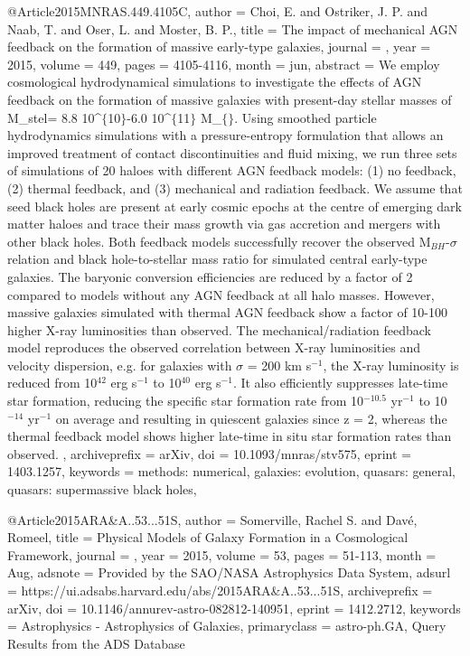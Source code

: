 \documentclass[longauth]{aa}
\begin{document}
{{{{@Article{2015MNRAS.449.4105C,
  author        = {Choi, E. and Ostriker, J. P. and Naab, T. and Oser, L. and Moster, B. P.},
  title         = {The impact of mechanical AGN feedback on the formation of massive early-type galaxies},
  journal       = {\mnras},
  year          = {2015},
  volume        = {449},
  pages         = {4105-4116},
  month         = jun,
  abstract      = {We employ cosmological hydrodynamical simulations to investigate the
effects of AGN feedback on the formation of massive galaxies with
present-day stellar masses of M\_stel= 8.8 {\times} 10\^{}$\{$10$\}$-6.0 {\times}
10\^{}$\{$11$\}$ M\_$\{${\sun}$\}$. Using smoothed particle hydrodynamics simulations
with a pressure-entropy formulation that allows an improved treatment of
contact discontinuities and fluid mixing, we run three sets of
simulations of 20 haloes with different AGN feedback models: (1) no
feedback, (2) thermal feedback, and (3) mechanical and radiation
feedback. We assume that seed black holes are present at early cosmic
epochs at the centre of emerging dark matter haloes and trace their mass
growth via gas accretion and mergers with other black holes. Both
feedback models successfully recover the observed M$_{BH}$-{$\sigma$}
relation and black hole-to-stellar mass ratio for simulated central
early-type galaxies. The baryonic conversion efficiencies are reduced by
a factor of 2 compared to models without any AGN feedback at all halo
masses. However, massive galaxies simulated with thermal AGN feedback
show a factor of {\tilde}10-100 higher X-ray luminosities than observed.
The mechanical/radiation feedback model reproduces the observed
correlation between X-ray luminosities and velocity dispersion, e.g. for
galaxies with {$\sigma$} = 200 km s$^{- 1}$, the X-ray luminosity is
reduced from 10$^{42}$ erg s$^{- 1}$ to 10$^{40}$ erg
s$^{- 1}$. It also efficiently suppresses late-time star
formation, reducing the specific star formation rate from
10$^{-10.5}$ yr$^{- 1}$ to 10$^{-14}$ yr$^{- 1}$
on average and resulting in quiescent galaxies since z = 2, whereas the
thermal feedback model shows higher late-time in situ star formation
rates than observed.
},
  archiveprefix = {arXiv},
  doi           = {10.1093/mnras/stv575},
  eprint        = {1403.1257},
  keywords      = {methods: numerical, galaxies: evolution, quasars: general, quasars: supermassive black holes},
}

@Article{2015ARA&A..53...51S,
  author        = {{Somerville}, Rachel S. and {Dav{\'e}}, Romeel},
  title         = {Physical Models of Galaxy Formation in a Cosmological Framework},
  journal       = {\araa},
  year          = {2015},
  volume        = {53},
  pages         = {51-113},
  month         = {Aug},
  adsnote       = {Provided by the SAO/NASA Astrophysics Data System},
  adsurl        = {https://ui.adsabs.harvard.edu/abs/2015ARA&A..53...51S},
  archiveprefix = {arXiv},
  doi           = {10.1146/annurev-astro-082812-140951},
  eprint        = {1412.2712},
  keywords      = {Astrophysics - Astrophysics of Galaxies},
  primaryclass  = {astro-ph.GA},
}
Query Results from the ADS Database


}}}}
\end{document}
